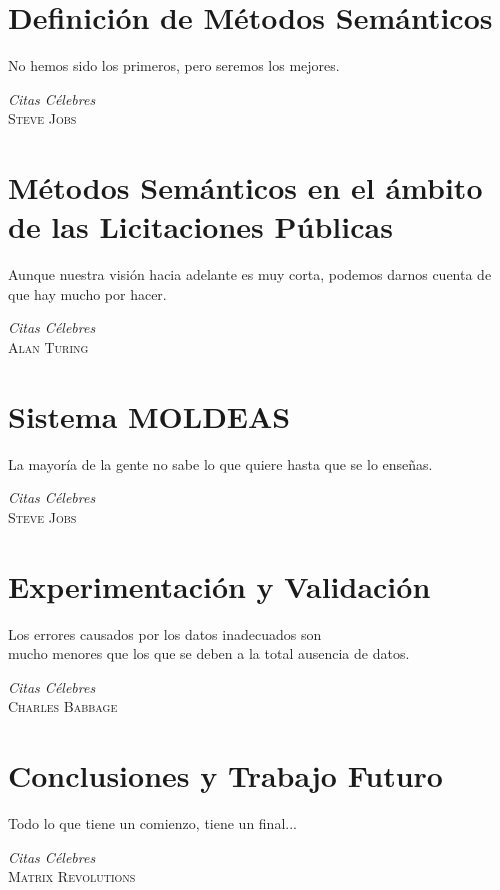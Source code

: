 \documentclass[a4paper,final,11pt,fleqn]{book}  %
\begin{document}
\chapter{\label{capitulo:metodos}Definición de Métodos Semánticos} %
\epigraph{No hemos sido los primeros, pero seremos los mejores.}
{\textit{Citas Célebres}\\ \textsc{Steve Jobs}}
%
\chapter{\label{capitulo:metodos-separados}Métodos Semánticos en el ámbito de las Licitaciones Públicas} %
\epigraph{Aunque nuestra visión hacia adelante es muy corta, podemos darnos cuenta de que hay mucho por hacer.}
{\textit{Citas Célebres}\\ \textsc{Alan Turing}}
%
\chapter{\label{capitulo:moldeas}Sistema MOLDEAS} %
\epigraph{La mayoría de la gente no sabe lo que quiere hasta que se lo enseñas.}
{\textit{Citas Célebres}\\ \textsc{Steve Jobs}}
%
\chapter{\label{capitulo:validacion}Experimentación y Validación} %
\epigraph{Los errores causados por los datos inadecuados son \\ mucho menores que los que se deben a la total ausencia de datos.}
{\textit{Citas Célebres}\\ \textsc{Charles Babbage}}
%
%
\chapter{\label{capitulo:conclusiones}Conclusiones y Trabajo Futuro} %
\epigraph{Todo lo que tiene un comienzo, tiene un final...}
{\textit{Citas Célebres}\\ \textsc{Matrix Revolutions}}
%
\appendix
\end{document}
